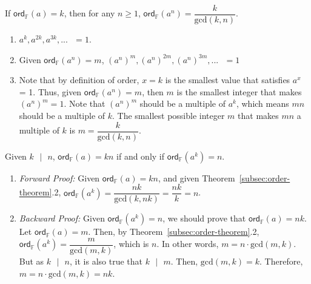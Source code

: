 \begin{tcolorbox}[title={\textbf{\tboxtheorem{\ref*{subsec:order-theorem}.2} Order Property (II)}}]
If $\textsf{ord}_{\mathbb{F}}(a) = k$, then for any $n \geq 1$, $\textsf{ord}_{\mathbb{F}}(a^n) = \dfrac{k} {\text{gcd}(k, n)}$.
\end{tcolorbox}
\begin{myproof}
    \begin{enumerate}
    \item $a^k, a^{2k}, a^{3k}, ... \text{ } = 1$. 
    \item Given $\textsf{ord}_{\mathbb{F}}(a^n) = m$, $(a^n)^m, (a^n)^{2m}, (a^n)^{3m}, ... \text{ } = 1$ 
    \item Note that by definition of order, $x=k$ is the smallest value that satisfies $a^x$ = 1. Thus, given $\textsf{ord}_{\mathbb{F}}(a^n) = m$, then $m$ is the smallest integer that makes $(a^n)^m = 1$. Note that $(a^n)^m$ should be a multiple of $a^k$, which means $mn$ should be a multiple of $k$. The smallest possible integer $m$ that makes $mn$ a multiple of $k$ is $m = \dfrac{k}{\text{gcd}(k, n)}$. 
    \end{enumerate}
\end{myproof}

\begin{tcolorbox}[title={\textbf{\tboxtheorem{\ref*{subsec:order-theorem}.3} Order Property (III)}}]
Given $k \text{ } | \text{ } n$, $\textsf{ord}_{\mathbb{F}}(a) = kn$ if and only if $\textsf{ord}_{\mathbb{F}}(a^k) = n$.
\end{tcolorbox}
\begin{myproof}
\begin{enumerate}
    \item \textit{Forward Proof:} Given $\textsf{ord}_{\mathbb{F}}(a) = kn$, and given Theorem~\ref*{subsec:order-theorem}.2, $\textsf{ord}_{\mathbb{F}}(a^k) = \dfrac{nk}{\text{gcd}(k, nk)} = \dfrac{nk}{k} = n$.
    \item \textit{Backward Proof:} Given $\textsf{ord}_{\mathbb{F}}(a^k) = n$, we should prove that $\textsf{ord}_{\mathbb{F}}(a) = nk$. Let $\textsf{ord}_{\mathbb{F}}(a) = m$. Then, by Theorem~\ref*{subsec:order-theorem}.2, $\textsf{ord}_{\mathbb{F}}(a^k) = \dfrac{m}{\text{gcd}(m, k)}$, which is $n$. In other words, $m = n \cdot \text{gcd}(m, k)$. But as $k \text{ } | \text{ } n$, it is also true that $k \text{ } | \text{ } m$. Then, $\text{gcd}(m, k) = k$. Therefore, $m = n \cdot \text{gcd}(m, k) = nk$.
\end{enumerate}
\end{myproof}

